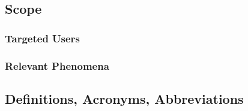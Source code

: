 


\subsection{Scope}
\subsubsection{Targeted Users}



\subsubsection{Relevant Phenomena}



\subsection{Definitions, Acronyms, Abbreviations}
